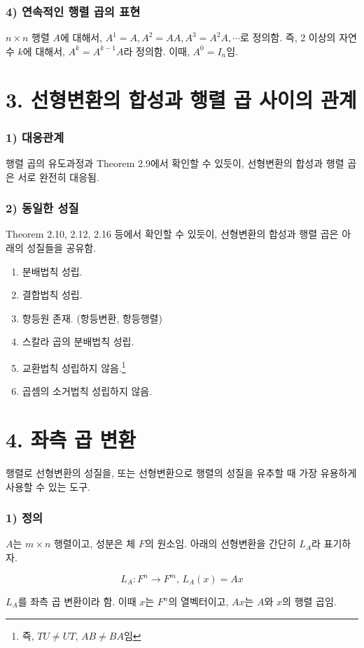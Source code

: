\subsubsection*{4) 연속적인 행렬 곱의 표현}
$n \times n$ 행렬 $A$에 대해서, $A^1=A,A^2=AA,A^3=A^2A, \cdots$로 정의함.
즉, 2 이상의 자연수 $k$에 대해서, $A^k=A^{k-1}A$라 정의함. 이때, $A^0=I_n$임.


\newpage


\section*{3. 선형변환의 합성과 행렬 곱 사이의 관계}
\subsubsection*{1) 대응관계}
행렬 곱의 유도과정과 Theorem 2.9에서 확인할 수 있듯이, 선형변환의 합성과 행렬 곱은 서로 완전히 대응됨.

\subsubsection*{2) 동일한 성질}
Theorem 2.10, 2.12, 2.16 등에서 확인할 수 있듯이, 선형변환의 합성과 행렬 곱은 아래의 성질들을 공유함.

\begin{enumerate}
    \item 분배법칙 성립.
    \item 결합법칙 성립.
    \item 항등원 존재. (항등변환, 항등행렬)
    \item 스칼라 곱의 분배법칙 성립.
    \item 교환법칙 성립하지 않음.\footnote{즉, $TU \neq UT$, $AB \neq BA$임}\\
    \item 곱셈의 소거법칙 성립하지 않음.
\end{enumerate}


\section*{4. 좌측 곱 변환}

행렬로 선형변환의 성질을, 또는 선형변환으로 행렬의 성질을 유추할 때 가장 유용하게 사용할 수 있는 도구.

\subsubsection*{1) 정의\\}
\begin{DEF}
$A$는 $m \times n$ 행렬이고, 성분은 체 $F$의 원소임. 아래의 선형변환을 간단히 $L_A$라 표기하자.

\[
L_A:F^n \rightarrow F^m,\, L_A(x)=Ax
\]

$L_A$를 좌측 곱 변환이라 함. 이때 $x$는 $F^n$의 열벡터이고, $Ax$는 $A$와 $x$의 행렬 곱임.
\end{DEF}

